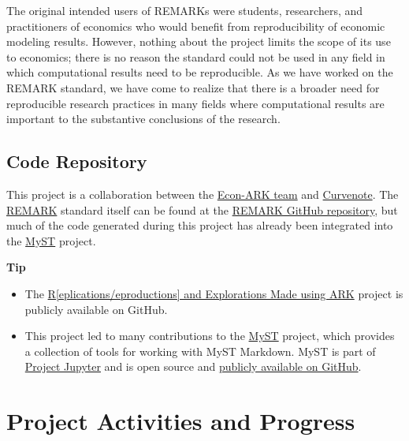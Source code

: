 \documentclass{article}
\begin{document}

The original intended users of REMARKs were students, researchers, and practitioners of economics who would benefit from reproducibility of economic modeling results. However, nothing about the project limits the scope of its use to economics; there is no reason the standard could not be used in any field in which computational results need to be reproducible. As we have worked on the REMARK standard, we have come to realize that there is a broader need for reproducible research practices in many fields where computational results are important to the substantive conclusions of the research.

\subsection{Code Repository}


This project is a collaboration between the \href{https://econ-ark.org/team}{Econ-ARK team} and \href{https://curvenote.com}{Curvenote}. The \href{https://github.com/econ-ark/REMARK}{REMARK} standard itself can be found at the \href{https://github.com/econ-ark/REMARK}{REMARK GitHub repository}, but much of the code generated during this project has already been integrated into the \href{https://myst-parser.readthedocs.io/en/v0.16.0/}{MyST} project.

\begin{framed}
\textbf{Tip}\\
\begin{itemize}
\item The \href{https://github.com/econ-ark/REMARK}{R[eplications/eproductions] and Explorations Made using ARK} project is publicly available on GitHub.
\item This project led to many contributions to the \href{https://mystmd.org/}{MyST} project, which provides a collection of tools for working with MyST Markdown. MyST is part of \href{https://jupyter.org}{Project Jupyter} and is open source and \href{https://github.com/jupyter-book/mystmd}{publicly available on GitHub}.
\end{itemize}
\end{framed}

\section{Project Activities and Progress}
\end{document}
